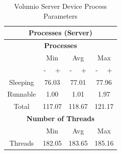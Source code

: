 \documentclass[11pt,a4paper]{scrreprt}
\begin{document}
\begin{table}[H]
\centering
    \begin{tabular}{||c|c|c|c|c|c|c||}
    \hline
    \multicolumn{7}{|c|}{\textbf{Processes (Server)}} \\
    \hline
    \multicolumn{7}{|c|}{\textbf{Processes}} \\
    \hline\hline
      & \multicolumn{2}{|c|}{Min} & \multicolumn{2}{|c|}{Avg} & \multicolumn{2}{|c|}{Max} \\
    \hline
      & - & + & - & + & - & + \\
    \hline
    Sleeping & \multicolumn{2}{|c|}{76.03} & \multicolumn{2}{|c|}{77.01} & \multicolumn{2}{|c|}{77.96} \\
    \hline
    Runnable & \multicolumn{2}{|c|}{1.00} & \multicolumn{2}{|c|}{1.01} & \multicolumn{2}{|c|}{1.97} \\
    \hline
    Total & \multicolumn{2}{|c|}{117.07} & \multicolumn{2}{|c|}{118.67} & \multicolumn{2}{|c|}{121.17} \\
    \hline\hline
    \multicolumn{7}{|c|}{\textbf{Number of Threads}} \\
    \hline\hline
      & \multicolumn{2}{|c|}{Min} & \multicolumn{2}{|c|}{Avg} & \multicolumn{2}{|c|}{Max} \\
    \hline
    Threads  & \multicolumn{2}{|c|}{182.05} & \multicolumn{2}{|c|}{183.65} & \multicolumn{2}{|c|}{185.16} \\
    \hline\hline
    \end{tabular}
    \caption{Volumio Server Device Process Parameters}
    \label{VolumioserverProcessTab}
\end{table}
\end{document}
